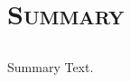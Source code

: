 \section{\scshape Summary}\label{sec:summary}

\subsection*{}
\begin{frame}{Summary}
	Text.
\end{frame}
